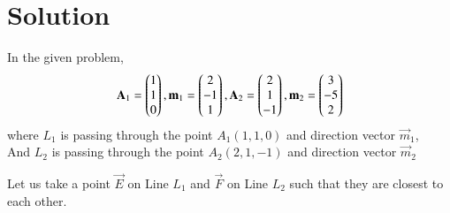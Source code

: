 \documentclass[journal,12pt,twocolumn]{IEEEtran}
\begin{document}
\section{Solution}
In the given problem,
\begin{align}\label{e3}
    \mathbf{A}_1 = \begin{pmatrix}1 \\ 1 \\ 0\end{pmatrix}, \mathbf{m}_1 = \begin{pmatrix}2 \\ -1 \\ 1\end{pmatrix}, \mathbf{A}_2 = \begin{pmatrix}2 \\ 1 \\ -1\end{pmatrix}, \mathbf{m}_2 = \begin{pmatrix}3 \\ -5 \\ 2\end{pmatrix}
\end{align}
where $L_1$ is passing through the point $A_1(1,1,0)$ and direction vector $\vec{m}_1$,\\
And $L_2$ is passing through the point $A_2(2,1,-1)$ and direction vector $\vec{m}_2$

Let us take a point $\vec{E}$ on Line $L_1$ and $\vec{F}$ on Line $L_2$ such that they are closest to each other.
\end{document}
